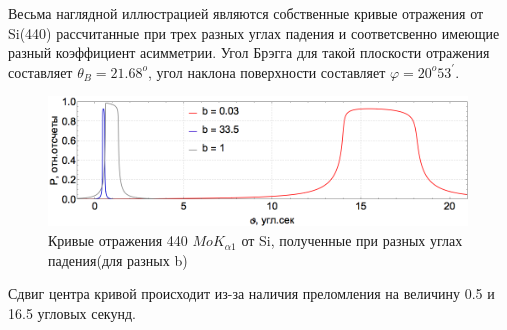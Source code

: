 \label{sec:rocking_curve_section}
Весьма наглядной иллюстрацией являются собственные кривые отражения от Si(440) рассчитанные при
трех разных углах падения и соответсвенно имеющие разный коэффициент асимметрии. Угол
Брэгга для такой плоскости отражения составляет $\theta_B = 21.68^o$, угол наклона поверхности
составляет $\varphi = 20^o 53^{'}$.

\begin{figure}[H]
\centering
\includegraphics[width=0.99\textwidth]{images/rocking_curve_assym_3.png}
\caption{Кривые отражения 440 $MoK_{\alpha 1}$ от Si, полученные при разных углах падения(для разных b)}
\label{ris:rocking_curve_assym_3}
\end{figure}
Сдвиг центра кривой происходит из-за наличия преломления на величину 0.5 и 16.5 угловых секунд.

